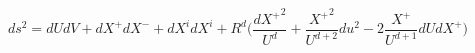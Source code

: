 \begin{equation}
\label{embedding}
ds^2=dUdV+dX^+dX^- +dX^idX^i+R^d\Big(\frac{{dX^+}^2}{U^d}+\frac{{X^+}^2}{U^{d+2}}du^2-2\frac{X^+}{U^{d+1}}dUdX^+\Big)
\end{equation}

